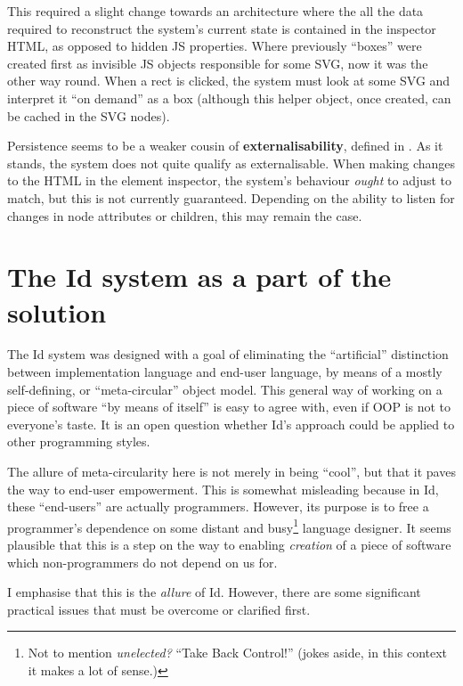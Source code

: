 This required a slight change towards an architecture where the all the
data required to reconstruct the system's current state is contained in
the inspector HTML, as opposed to hidden JS properties. Where previously
``boxes'' were created first as invisible JS objects responsible for
some SVG, now it was the other way round. When a rect is clicked, the
system must look at some SVG and interpret it ``on demand'' as a box
(although this helper object, once created, can be cached in the SVG
nodes).

Persistence seems to be a weaker cousin of \textbf{externalisability},
defined in \cite{externalise}. As it stands, the system does not quite
qualify as externalisable. When making changes to the HTML in the
element inspector, the system's behaviour \emph{ought} to adjust to
match, but this is not currently guaranteed. Depending on the ability to
listen for changes in node attributes or children, this may remain the
case.

\hypertarget{the-id-system-as-a-part-of-the-solution}{%
\section{The Id system as a part of the
solution}\label{the-id-system-as-a-part-of-the-solution}}

The Id{} system was designed with a goal of eliminating the
``artificial'' distinction between implementation language and end-user
language, by means of a mostly self-defining, or ``meta-circular''
object model. This general way of working on a piece of software ``by
means of itself'' is easy to agree with, even if OOP is not to
everyone's taste. It is an open question whether Id{}'s approach could
be applied to other programming styles.

The allure of meta-circularity here is not merely in being ``cool'', but
that it paves the way to end-user empowerment. This is somewhat
misleading because in Id{}, these ``end-users'' are actually
programmers. However, its purpose is to free a programmer's dependence
on some distant and busy\footnote{Not to mention \emph{unelected?}
  ``Take Back Control!'' (jokes aside, in this context it makes a lot of
  sense.)} language designer. It seems plausible that this is a step on
the way to enabling \emph{creation} of a piece of software which
non-programmers do not depend on us for.

I emphasise that this is the \emph{allure} of Id{}. However, there are
some significant practical issues that must be overcome or clarified
first.

